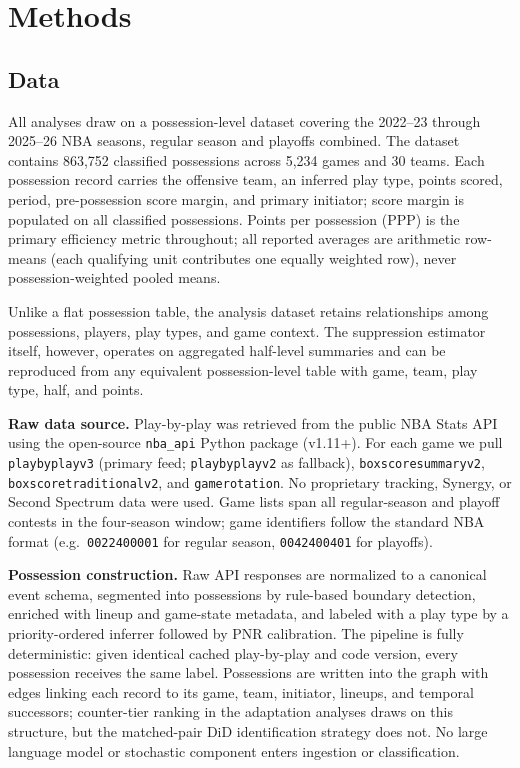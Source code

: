 \documentclass[11pt]{article}
\begin{document}
\section{Methods}
\label{sec:methods}

\subsection{Data}

All analyses draw on a possession-level dataset covering the 2022--23 through 2025--26 NBA seasons, regular season and playoffs combined. The dataset contains 863,752 classified possessions across 5,234 games and 30 teams. Each possession record carries the offensive team, an inferred play type, points scored, period, pre-possession score margin, and primary initiator; score margin is populated on all classified possessions. Points per possession (PPP) is the primary efficiency metric throughout; all reported averages are arithmetic row-means (each qualifying unit contributes one equally weighted row), never possession-weighted pooled means.

Unlike a flat possession table, the analysis dataset retains relationships among possessions, players, play types, and game context. The suppression estimator itself, however, operates on aggregated half-level summaries and can be reproduced from any equivalent possession-level table with game, team, play type, half, and points.

\textbf{Raw data source.} Play-by-play was retrieved from the public NBA Stats API using the open-source \texttt{nba\_api} Python package (v1.11+). For each game we pull \texttt{playbyplayv3} (primary feed; \texttt{playbyplayv2} as fallback), \texttt{boxscoresummaryv2}, \texttt{boxscoretraditionalv2}, and \texttt{gamerotation}. No proprietary tracking, Synergy, or Second Spectrum data were used. Game lists span all regular-season and playoff contests in the four-season window; game identifiers follow the standard NBA format (e.g.\ \texttt{0022400001} for regular season, \texttt{0042400401} for playoffs).

\textbf{Possession construction.} Raw API responses are normalized to a canonical event schema, segmented into possessions by rule-based boundary detection, enriched with lineup and game-state metadata, and labeled with a play type by a priority-ordered inferrer followed by PNR calibration. The pipeline is fully deterministic: given identical cached play-by-play and code version, every possession receives the same label. Possessions are written into the graph with edges linking each record to its game, team, initiator, lineups, and temporal successors; counter-tier ranking in the adaptation analyses draws on this structure, but the matched-pair DiD identification strategy does not. No large language model or stochastic component enters ingestion or classification.
\end{document}
